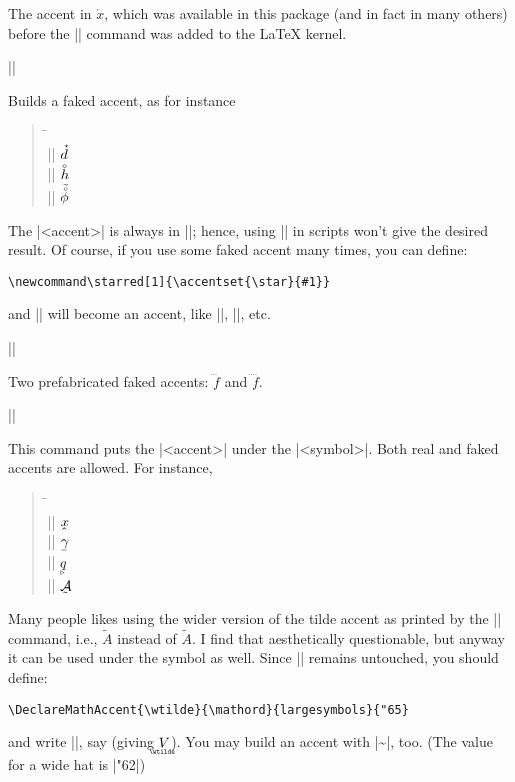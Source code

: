 \documentclass{ltxguide}
\newenvironment{sample}{\begin{quote}\small\begin{tabbing}%
  \hskip14pc\=\hskip6pc\\}
  {\end{tabbing}\end{quote}}
\begin{document}
The accent in $\ring{x}$, which was available in this package (and
in fact in many others) before
the |\mathring| command was added to the \LaTeX{} kernel.

\begin{decl}
||
\end{decl}

Builds a faked accent, as for instance
\begin{sample}
||    \> $\accentset{\star}{d}$\\
|| \> $\accentset{\diamond}{h}$\\
|\tilde{\accentset{\circ}{\phi}}| \>
    $\tilde{\accentset{\circ}{\phi}}$
\end{sample}
The |<accent>| is always in |\scriptscriptmode|; hence, using
|\accentset| in scripts won't give the desired  result. Of course,
if you use some faked accent many times, you can define:
\begin{verbatim}
\newcommand\starred[1]{\accentset{\star}{#1}}
\end{verbatim}
and |\starred| will become an accent, like |\hat|, |\tilde|, etc.

\begin{decl}
|\dddot  \ddddot|
\end{decl}

Two prefabricated faked accents: $\dddot{f}$ and $\ddddot{f}$.

\begin{decl}
||
\end{decl}

This command puts the |<accent>| under the |<symbol>|. Both real
and faked accents are allowed. For instance,
\begin{sample}
||      \> $\underaccent{\hat}{x}$\\
|\underaccent{\bar}{\gamma}| \> $\underaccent{\bar}{\gamma}$\\
||  \>
   $\underaccent{\triangleright}{q}$\\
|| \>
    $\underaccent{\tilde}{\mathcal{A}}$
\end{sample}

Many people likes using the wider version of the tilde accent as 
printed by the |\widetilde| command, i.e., $\widetilde{A}$ instead of 
$\tilde{A}$.  I find that aesthetically questionable, but anyway it
can be used under the symbol as well. Since |\widetilde| remains
untouched, you should define:
\begin{verbatim}
\DeclareMathAccent{\wtilde}{\mathord}{largesymbols}{"65}
\end{verbatim}
and write ||, say (giving 
$\underaccent{\wtilde}{V}$). You may build an accent with
|\sim|, too. (The value for a wide hat is |"62|)
\end{document}
